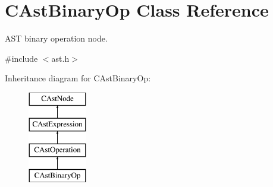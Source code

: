 \hypertarget{classCAstBinaryOp}{\section{C\-Ast\-Binary\-Op Class Reference}
\label{classCAstBinaryOp}
}


A\-S\-T binary operation node.  




{\ttfamily \#include $<$ast.\-h$>$}

Inheritance diagram for C\-Ast\-Binary\-Op\-:\begin{figure}[H]
\begin{center}
\leavevmode
\includegraphics[height=4.000000cm]{classCAstBinaryOp}
\end{center}
\end{figure}
